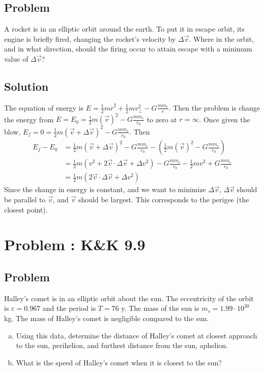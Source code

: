 \documentclass[solutions]{esg8012pset}
\begin{document}
\subsection{Problem}
  A rocket is in an elliptic orbit around the earth. To put it in escape orbit, its engine is briefly fired, changing the rocket's velocity by $\Delta \vec v$. Where in the orbit, and in what direction, should the firing occur to attain escape with a minimum value of $\Delta \vec v$?
\subsection{Solution}
The equation of energy is $E = \frac{1}{2} m\dot r^2 + \frac{1}{2}m v_{\bot}^2 - G\frac{m m_e}{r}$.  Then the problem is change the energy from $E = E_0 = \frac{1}{2} m(\vec v)^2 - G\frac{m m_e}{r_0}$ to zero at $r =\infty$.  Once given the blow, $E_f = 0 = \frac{1}{2} m(\vec v + \Delta \vec v)^2 - G\frac{m m_e}{r_0}$.  Then
\begin{align*}
E_f - E_0 & = \frac{1}{2} m(\vec v + \Delta \vec v)^2 - G\frac{m m_e}{r_0} -   \left(\frac{1}{2} m(\vec v)^2 - G\frac{m m_e}{r_0}\right) \\
 & = \frac{1}{2} m(v^2 + 2\vec v\cdot \Delta \vec v + \Delta v^2) - G\frac{m m_e}{r_0} - \frac{1}{2} mv^2 + G\frac{m m_e}{r_0} \\
 & = \frac{1}{2} m(2\vec v\cdot \Delta \vec v + \Delta v^2)
\end{align*}
Since the change in energy is constant, and we want to minimize $\Delta \vec v$, $\Delta \vec v$ should be parallel to $\vec v$, and $\vec v$ should be largest.  This corresponds to the perigee (the closest point).
\section{Problem \thesection: K\&K 9.9}
\subsection{Problem}
  Halley's comet is in an elliptic orbit about the sun. The eccentricity of the orbit is $\varepsilon = 0.967$ and the period is $T = 76$ y. The mass of the sun is $m_s = 1.99 \cdot 10^{30}$ kg.  The mass of Halley's comet is negligible compared to the sun.
  \begin{enumerate}[(a)]
    \item Using this data, determine the distance of Halley's comet at closest approach to the sun, perihelion, and furthest distance from the sun, aphelion.
    \item What is the speed of Halley's comet when it is closest to the sun?
  \end{enumerate}
\end{document}

